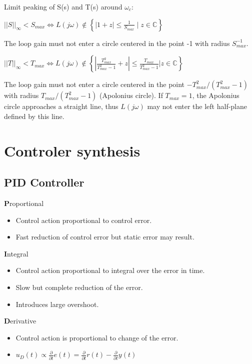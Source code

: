 \documentclass[10pt,a4paper]{scrartcl}
\begin{document}
\begin{multicols*}{3}
	Limit peaking of S(s) and T(s) around $\omega_c$:
	
	
	
	$||S||_\infty<S_{max}\Leftrightarrow L(j\omega)\not\in\left\{|1+z|\leq\frac{1}{S_{max}}\mid z\in \mathbb{C}\right\}$
	
	The loop gain must not enter a circle centered in the point -1 with radius $S_{max}^{-1}$.
	
	\finn
	
	$||T||_\infty<T_{max}\Leftrightarrow L(j\omega)\not\in\left\{\left|\frac{T^2_{max}}{T^2_{max}-1}+z\right|\leq\frac{T_{max}}{T^2_{max}-1}|z\in\mathbb{C}\right\}$
	
	The loop gain must not enter a circle centered in the point $-T^2_{max}/(T^2_{max}-1)$ with radius $T_{max}/(T_{max}^2-1)$ (Apolonius circle). 
	If $T_{max}=1$, the Apolonius circle approaches a straight line, thus $L(j\omega)$ may not enter the left half-plane defined by this line. 
	
	
	
	\section{Controler synthesis}
	
	\subsection{PID Controller}
	
	
	\textbf{P}roportional
	\begin{itemize}
	\compaq
	\item
	Control action proportional to control error.
	\item
	Fast reduction of control error but static error may result.
	\end{itemize}
	
	\textbf{I}ntegral
	\begin{itemize}
	\compaq
	\item
	Control action proportional to integral over the error in time.
	\item
	Slow but complete reduction of the error.
	\item
	Introduces large overshoot.
	\end{itemize}
	
	\textbf{D}erivative
	\begin{itemize}
	\compaq
	\item
	Control action is proportional to change of the error.
	\item
	$u_D(t)\propto \frac{\partial}{\partial t} e(t) = \frac{\partial }{\partial t} r(t) - \frac{\partial}{\partial t} y(t)$
	

\end{itemize}
\end{multicols*}
\end{document}
